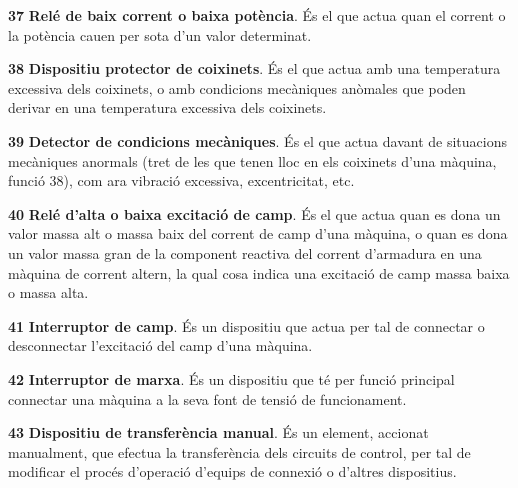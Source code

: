 \begin{multicols}{2}
\begin{list}{}
\item[\textbf{37}] 
 \textbf{Relé de baix corrent o baixa potència}. És el que actua quan el corrent o la potència cauen per
sota d'un valor determinat.

\item[\textbf{38}] 
\textbf{Dispositiu protector de coixinets}. És el que actua amb una
temperatura excessiva dels coixinets, o amb condicions mecàniques
anòmales que poden derivar en una temperatura excessiva dels
coixinets.

\item[\textbf{39}]  
\textbf{Detector de condicions mecàniques}. És el que actua davant
de situacions mecàniques anormals (tret de les que tenen lloc en els
coixinets d'una màquina, funció 38), com ara vibració excessiva,
excentricitat, etc.

\item[\textbf{40}]  
 \textbf{Relé d'alta o baixa excitació de camp}. És el que actua quan es
dona un valor massa alt o massa baix del corrent de camp d'una màquina, o quan es dona un valor
massa gran de la component reactiva del corrent d'armadura en una màquina de corrent
altern, la qual cosa indica una excitació de camp massa baixa o massa alta.

\item[\textbf{41}]   
\textbf{Interruptor de camp}. És un dispositiu
que actua per tal de connectar o desconnectar l'excitació del camp
d'una màquina.

\item[\textbf{42}]   
\textbf{Interruptor de marxa}. És un
dispositiu que té per funció principal connectar una màquina a la
seva font de tensió de funcionament.

\item[\textbf{43}]  
 \textbf{Dispositiu de transferència manual}. És
un element, accionat manualment, que efectua la transferència dels circuits de control, per tal
 de modificar el procés d'operació d'equips de connexió o d'altres dispositius.


\end{list}
\end{multicols}
